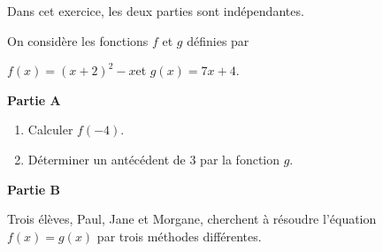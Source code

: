 \documentclass[exercice,a4]{thedocument}%
\begin{document}
%
    


\medskip

Dans cet exercice, les deux parties sont indépendantes.

On considère les fonctions $f$ et $g$ définies par 

\begin{center} $f(x) = (x + 2)^2 - x$\quad et \quad  $g(x) = 7x + 4$.\end{center}

\smallskip

\textbf{Partie A}

\medskip

\begin{enumerate}
\item Calculer $f(- 4)$.
\item Déterminer un antécédent de $3$ par la fonction $g$.
\end{enumerate}

\medskip

\textbf{Partie B}

\medskip

Trois élèves, Paul, Jane et Morgane, cherchent à résoudre l'équation $f(x) = g(x)$ par trois méthodes différentes.

\medskip
\end{document}
